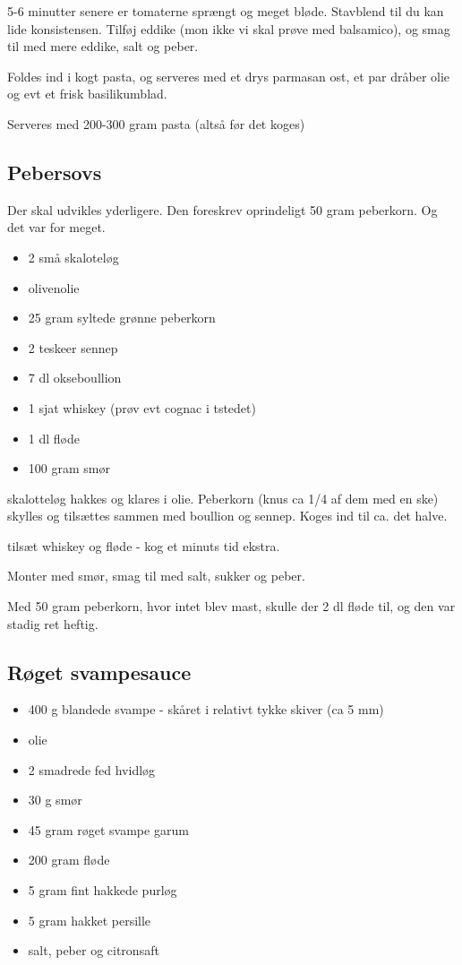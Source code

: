 \documentclass[
]{book}
\providecommand{\tightlist}{%
  \setlength{\itemsep}{0pt}\setlength{\parskip}{0pt}}
\begin{document}
5-6 minutter senere er tomaterne sprængt og meget bløde. Stavblend til du kan lide konsistensen. Tilføj
eddike (mon ikke vi skal prøve med balsamico), og smag til med mere eddike, salt og peber.

Foldes ind i kogt pasta, og serveres med et drys parmasan ost, et par dråber olie og evt et frisk basilikumblad.

Serveres med 200-300 gram pasta (altså før det koges)

\subsection{Pebersovs}\label{pebersovs}

Der skal udvikles yderligere.
Den foreskrev oprindeligt 50 gram peberkorn. Og det var for meget.

\begin{itemize}
\tightlist
\item
  2 små skaloteløg
\item
  olivenolie
\item
  25 gram syltede grønne peberkorn
\item
  2 teskeer sennep
\item
  7 dl okseboullion
\item
  1 sjat whiskey (prøv evt cognac i tstedet)
\item
  1 dl fløde
\item
  100 gram smør
\end{itemize}

skalotteløg hakkes og klares i olie.
Peberkorn (knus ca 1/4 af dem med en ske) skylles og tilsættes
sammen med boullion og sennep. Koges ind til ca. det halve.

tilsæt whiskey og fløde - kog et minuts tid ekstra.

Monter med smør, smag til med salt, sukker og peber.

Med 50 gram peberkorn, hvor intet blev mast, skulle der
2 dl fløde til, og den var stadig ret heftig.

\subsection{Røget svampesauce}\label{ruxf8get-svampesauce}

\begin{itemize}
\tightlist
\item
  400 g blandede svampe - skåret i relativt tykke skiver (ca 5 mm)
\item
  olie
\item
  2 smadrede fed hvidløg
\item
  30 g smør
\item
  45 gram røget svampe garum
\item
  200 gram fløde
\item
  5 gram fint hakkede purløg
\item
  5 gram hakket persille
\item
  salt, peber og citronsaft
\end{itemize}
\end{document}
